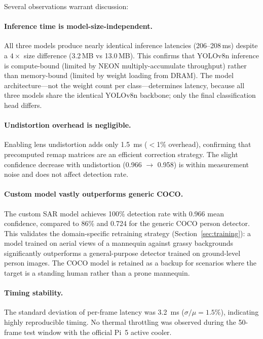 Several observations warrant discussion:

\paragraph{Inference time is model-size-independent.}
All three models produce nearly identical inference latencies (206--208\,ms) despite a $4\times$ size difference (3.2\,MB vs 13.0\,MB).  This confirms that YOLOv8n inference is compute-bound (limited by NEON multiply-accumulate throughput) rather than memory-bound (limited by weight loading from DRAM).  The model architecture---not the weight count per class---determines latency, because all three models share the identical YOLOv8n backbone; only the final classification head differs.

\paragraph{Undistortion overhead is negligible.}
Enabling lens undistortion adds only \SI{1.5}{\milli\second} ($<$1\% overhead), confirming that precomputed remap matrices are an efficient correction strategy.  The slight confidence decrease with undistortion (0.966 $\to$ 0.958) is within measurement noise and does not affect detection rate.

\paragraph{Custom model vastly outperforms generic COCO.}
The custom SAR model achieves 100\% detection rate with 0.966 mean confidence, compared to 86\% and 0.724 for the generic COCO person detector.  This validates the domain-specific retraining strategy (Section~\ref{sec:training}): a model trained on aerial views of a mannequin against grassy backgrounds significantly outperforms a general-purpose detector trained on ground-level person images.  The COCO model is retained as a backup for scenarios where the target is a standing human rather than a prone mannequin.

\paragraph{Timing stability.}
The standard deviation of per-frame latency was \SI{3.2}{\milli\second} ($\sigma / \mu = 1.5\%$), indicating highly reproducible timing.  No thermal throttling was observed during the 50-frame test window with the official Pi~5 active cooler.

